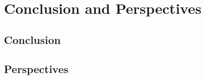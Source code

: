 \chapter{Conclusion and Perspectives}
\label{cha:conclusion}

\section{Conclusion}

\section{Perspectives}